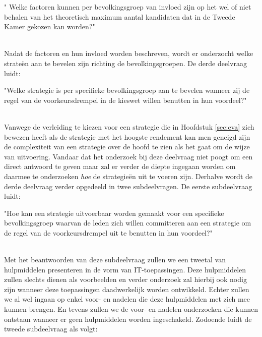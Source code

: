 \begin{DV}" Welke factoren kunnen per bevolkingsgroep van invloed zijn op het wel of niet behalen van het theoretisch maximum aantal kandidaten dat in de Tweede Kamer gekozen kan worden?"\\\
\end{DV}

Nadat de factoren en hun invloed worden beschreven, wordt er onderzocht welke strate\"{e}n aan te bevelen zijn richting de bevolkingsgroepen. De derde deelvraag luidt:\\

\begin{DV}"Welke strategie is per specifieke bevolkingsgroep aan te bevelen wanneer zij de regel van de voorkeursdrempel in de kieswet willen benutten in hun voordeel?"\\\
\end{DV}

Vanwege de verleiding te kiezen voor een strategie die in Hoofdstuk \ref{sec:eva} zich bewezen heeft als de strategie met het hoogste rendement kan men geneigd zijn de complexiteit van een strategie over de hoofd te zien als het gaat om de wijze van uitvoering. Vandaar dat het onderzoek bij deze deelvraag niet poogt om een direct antwoord te geven maar zal er verder de diepte ingegaan worden om daarmee te onderzoeken \textit{hoe} de strategie\"{e}n uit te voeren zijn. Derhalve wordt de derde deelvraag verder opgedeeld in twee subdeelvragen. De eerste subdeelvraag luidt:\\

\begin{SDV}"Hoe kan een strategie uitvoerbaar worden gemaakt voor een specifieke bevolkingsgroep waarvan de leden zich willen committeren aan een strategie om de regel van de voorkeursdrempel uit te benutten in hun voordeel?"\\\
\end{SDV}

Met het beantwoorden van deze subdeelvraag zullen we een tweetal van hulpmiddelen presenteren in de vorm van IT-toepassingen. Deze hulpmiddelen zullen slechts dienen als voorbeelden en verder onderzoek zal hierbij ook nodig zijn wanneer deze toepassingen daadwerkelijk worden ontwikkeld. Echter zullen we al wel ingaan op enkel voor- en nadelen die deze hulpmiddelen met zich mee kunnen brengen. En tevens zullen we de voor- en nadelen onderzoeken die kunnen ontstaan wanneer er geen hulpmiddelen worden ingeschakeld. Zodoende luidt de tweede subdeelvraag als volgt: \\\

